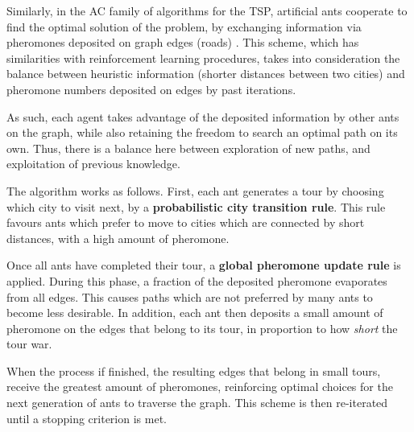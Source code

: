 Similarly, in the AC family of algorithms for the TSP, artificial ants cooperate to find the optimal solution of the problem, by exchanging information via pheromones deposited on graph edges (roads) \cite{dorigo1997ant}. This scheme, which has similarities with reinforcement learning procedures, takes into consideration the balance between heuristic information (shorter distances between two cities) and pheromone numbers deposited on edges by past iterations.

As such, each agent takes advantage of the deposited information by other ants on the graph, while also retaining the freedom to search an optimal path on its own. Thus, there is a balance here between exploration of new paths, and exploitation of previous knowledge. 

The algorithm works as follows. First, each ant generates a tour by choosing which city to visit next, by a \textbf{probabilistic city transition rule}. This rule favours ants which prefer to move to cities which are connected by short distances, with a high amount of pheromone.

Once all ants have completed their tour, a \textbf{global pheromone update rule} is applied. During this phase, a fraction of the deposited pheromone evaporates from all edges. This causes paths which are not preferred by many ants to become less desirable. In addition, each ant then deposits a small amount of pheromone on the edges that belong to its tour, in proportion to how \textit{short} the tour war. 

When the process if finished, the resulting edges that belong in small tours, receive the greatest amount of pheromones, reinforcing optimal choices for the next generation of ants to traverse the graph. This scheme is then re-iterated until a stopping criterion is met.
